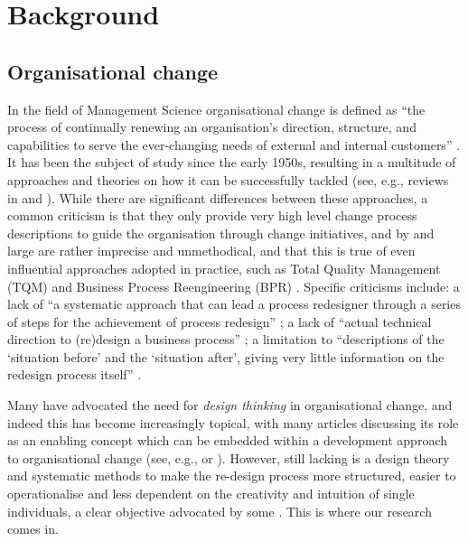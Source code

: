 \documentclass[runningheads,a4paper]{llncs}
\begin{document}
\section{Background} \label{sect:Background}

\subsection{Organisational change}
In the field of Management Science organisational change is defined as ``the process of continually renewing an organisation's direction, structure, and capabilities to serve the ever-changing needs of external and internal customers'' \cite{Moran:2000ex}. It has been the subject of study since the early 1950s, resulting in a multitude of approaches and theories on how it can be successfully tackled (see, e.g., reviews in \cite{vandeVen:1995uw} and \cite{pettigrew2001studying}). While there are significant differences between these approaches, a common criticism is that they only provide very high level change process descriptions to guide the organisation through change initiatives, and by and large are rather imprecise and unmethodical, and that this is true of even influential approaches adopted in practice, such as Total Quality Management (TQM) and Business Process Reengineering (BPR) \cite{Cao:2004dh}. Specific criticisms include: a lack of ``a systematic approach that can lead a process redesigner through a series of steps for the achievement of process redesign'' \cite{doi:10.1108/14637159910249117}; a lack of ``actual technical direction to (re)design a business process'' \cite{Reijers2005283}; a limitation to ``descriptions of the `situation before' and the `situation after', giving very little information on the redesign process itself'' \cite{Gerrits:1994:BMB:646303.686971}.

Many have advocated the need for {\it design thinking} \cite{rowe1991design} in organisational change, and indeed this has become increasingly topical, with many articles discussing its role as an enabling concept which can be embedded within a development approach to organisational change (see, e.g., \cite{3460223} or \cite{deserti2014design}). However, still lacking is a design theory and systematic methods to make the re-design process more structured, easier to operationalise and less dependent on the creativity and intuition of single individuals, a clear objective advocated by some \cite{verkerk2004trust,Kleiner:2000vm}. This is where our research comes in.
\end{document}
